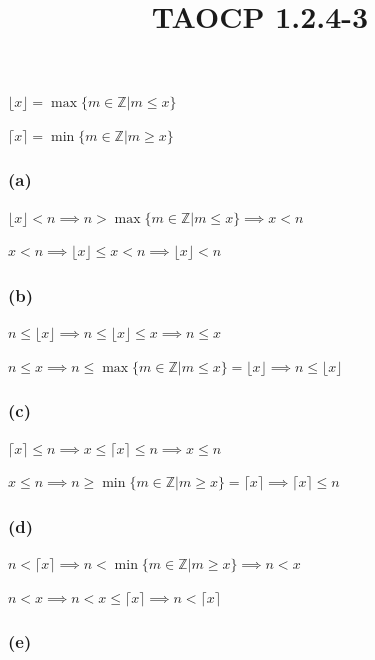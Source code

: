 \documentclass{article}
\title{TAOCP 1.2.4\mbox{-}3}
\begin{document}
\maketitle

\( \lfloor x \rfloor = \max \{ m \in \mathbb{Z} | m \leq x \} \)

\( \lceil x \rceil = \min \{ m \in \mathbb{Z} | m \geq x \} \)

\subsubsection*{(a)}

\( \lfloor x \rfloor < n \implies n > \max \{ m \in \mathbb{Z} | m \leq x \}  \implies x < n \)

\( x < n \implies \lfloor x \rfloor \leq x < n \implies \lfloor x \rfloor < n \)

\subsubsection*{(b)}

\( n \leq \lfloor x \rfloor \implies n \leq \lfloor x \rfloor \leq x \implies n \leq x \)

\( n \leq x \implies n \leq \max \{ m \in \mathbb{Z} | m \leq x \} = \lfloor x \rfloor \implies n \leq \lfloor x \rfloor \)

\subsubsection*{(c)}

\( \lceil x \rceil \leq n \implies x \leq \lceil x \rceil \leq n \implies x \leq n \)

\( x \leq n \implies n \geq \min \{ m \in \mathbb{Z} | m \geq x \} = \lceil x \rceil \implies \lceil x \rceil \leq n \)

\subsubsection*{(d)}

\( n < \lceil x \rceil \implies n < \min \{ m \in \mathbb{Z} | m \geq x \} \implies n < x \)

\( n < x \implies n < x \leq \lceil x \rceil \implies n < \lceil x \rceil \)

\subsubsection*{(e)}
\end{document}
